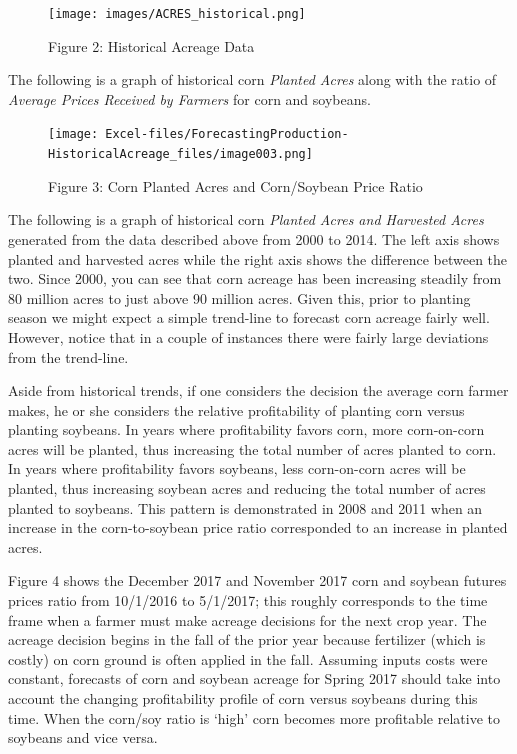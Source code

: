 \documentclass[
]{book}
\begin{document}
\begin{figure}
\centering
\texttt{[image: images/ACRES\_historical.png]}
\caption{Figure 2: Historical Acreage Data}
\end{figure}

The following is a graph of historical corn \emph{Planted Acres} along with the ratio of \emph{Average Prices Received by Farmers} for corn and soybeans.

\begin{figure}
\centering
\texttt{[image: Excel-files/ForecastingProduction-HistoricalAcreage\_files/image003.png]}
\caption{Figure 3: Corn Planted Acres and Corn/Soybean Price Ratio}
\end{figure}

The following is a graph of historical corn \emph{Planted Acres and Harvested Acres} generated from the data described above from 2000 to 2014. The left axis shows planted and harvested acres while the right axis shows the difference between the two. Since 2000, you can see that corn acreage has been increasing steadily from 80 million acres to just above 90 million acres. Given this, prior to planting season we might expect a simple trend-line to forecast corn acreage fairly well. However, notice that in a couple of instances there were fairly large deviations from the trend-line.

Aside from historical trends, if one considers the decision the average corn farmer makes, he or she considers the relative profitability of planting corn versus planting soybeans. In years where profitability favors corn, more corn-on-corn acres will be planted, thus increasing the total number of acres planted to corn. In years where profitability favors soybeans, less corn-on-corn acres will be planted, thus increasing soybean acres and reducing the total number of acres planted to soybeans. This pattern is demonstrated in 2008 and 2011 when an increase in the corn-to-soybean price ratio corresponded to an increase in planted acres.

Figure 4 shows the December 2017 and November 2017 corn and soybean futures prices ratio from 10/1/2016 to 5/1/2017; this roughly corresponds to the time frame when a farmer must make acreage decisions for the next crop year. The acreage decision begins in the fall of the prior year because fertilizer (which is costly) on corn ground is often applied in the fall. Assuming inputs costs were constant, forecasts of corn and soybean acreage for Spring 2017 should take into account the changing profitability profile of corn versus soybeans during this time. When the corn/soy ratio is `high' corn becomes more profitable relative to soybeans and vice versa.
\end{document}
